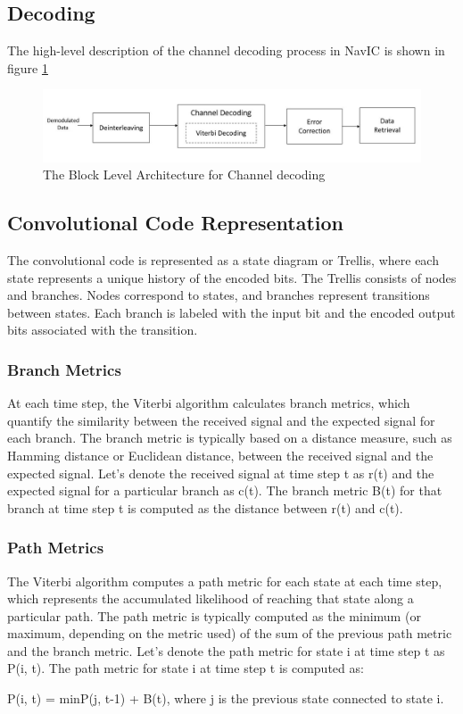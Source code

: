 \subsection{Decoding}
The high-level description of the channel decoding process in NavIC is shown in figure \ref{fig:decoding_r}
\begin{normalsize}
\begin{figure}[ht]
\centering
\includegraphics[width=1\columnwidth]{figs/decoding_r.jpg}
\centering
\captionsetup{justification=centering}
\caption{The Block Level Architecture for Channel decoding}
\label{fig:decoding_r}
\end{figure}
\end{normalsize}


\subsection{Convolutional Code Representation}

The convolutional code is represented as a state diagram or Trellis, where each state represents a unique history of the encoded bits.
The Trellis consists of nodes and branches. Nodes correspond to states, and branches represent transitions between states.
Each branch is labeled with the input bit and the encoded output bits associated with the transition.

\subsubsection{Branch Metrics}
At each time step, the Viterbi algorithm calculates branch metrics, which quantify the similarity between the received signal and the expected signal for each branch.
The branch metric is typically based on a distance measure, such as Hamming distance or Euclidean distance, between the received signal and the expected signal.
Let's denote the received signal at time step t as r(t) and the expected signal for a particular branch as c(t). The branch metric B(t) for that branch at time step t is computed as the distance between r(t) and c(t).

\subsubsection{Path Metrics}
The Viterbi algorithm computes a path metric for each state at each time step, which represents the accumulated likelihood of reaching that state along a particular path.
The path metric is typically computed as the minimum (or maximum, depending on the metric used) of the sum of the previous path metric and the branch metric.
Let's denote the path metric for state i at time step t as P(i, t). The path metric for state i at time step t is computed as:
\begin{center}
P(i, t) = min{P(j, t-1) + B(t)}, where j is the previous state connected to state i.
\end{center}

